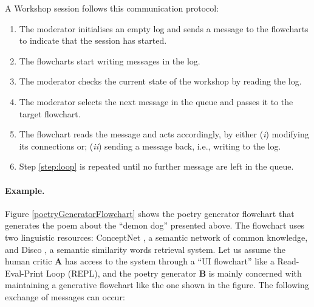 A Workshop session follows this communication protocol:
\begin{enumerate}
\item The moderator initialises an empty log and sends a message to the flowcharts to indicate that the session has started. 
\item The flowcharts start writing messages in the log.
\item The moderator checks the current state of the workshop by reading the log. \label{step:loop}
\item The moderator selects the next message in the queue and passes it to the target flowchart. 
\item The flowchart reads the message and acts accordingly, by either (\emph{i}) modifying its connections or; (\emph{ii}) sending a message back, i.e., writing to the log. 
\item Step \ref{step:loop} is repeated until no further message are left in the queue.
\end{enumerate}


\paragraph{Example.}
Figure \ref{poetryGeneratorFlowchart} shows the poetry generator flowchart that generates the poem about the ``demon dog'' presented above. The flowchart uses two linguistic resources: ConceptNet \cite{ConceptNet}, a semantic network of common knowledge, and Disco \cite{Disco}, a semantic similarity words retrieval system. Let us assume the human critic $\mathbf{A}$ has access to the system through a ``UI flowchart'' like a Read-Eval-Print Loop (REPL), and the poetry generator $\mathbf{B}$ is mainly concerned with maintaining a generative flowchart like the one shown in the figure. The following exchange of messages can occur:

